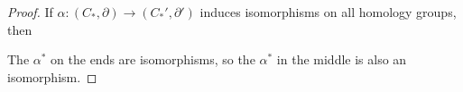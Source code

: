 \begin{proof}
  If $\alpha : (C_*, \partial) \to (C_*', \partial')$
  induces isomorphisms on all homology groups,
  then
  \begin{center}
  \end{center}
  The $\alpha^*$ on the ends are isomorphisms, so
  the $\alpha^*$ in the middle is also an
  isomorphism.
\end{proof}
